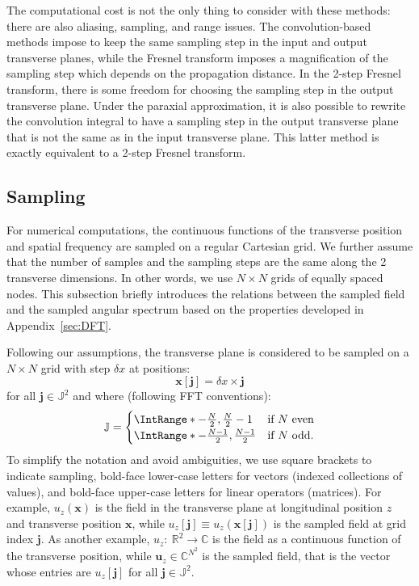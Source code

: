 \documentclass[a4paper]{article}
\newcommand*{\V}[1]{\boldsymbol{#1}}
\newcommand*{\from}{{:}\:}
\newcommand*{\Set}[1]{\mathbb{#1}}
\begin{document}
The computational cost is not the only thing to consider with these methods: there are
also aliasing, sampling, and range issues. The convolution-based methods impose to keep
the same sampling step in the input and output transverse planes, while the Fresnel
transform imposes a magnification of the sampling step which depends on the propagation
distance. In the 2-step Fresnel transform, there is some freedom for choosing the sampling
step in the output transverse plane. Under the paraxial approximation, it is also possible
to rewrite the convolution integral to have a sampling step in the output transverse plane
that is not the same as in the input transverse plane. This latter method is exactly
equivalent to a 2-step Fresnel transform.

\subsection{Sampling}

For numerical computations, the continuous functions of the transverse position and
spatial frequency are sampled on a regular Cartesian grid. We further assume that the
number of samples and the sampling steps are the same along the 2 transverse dimensions.
In other words, we use $N×N$ grids of equally spaced nodes. This subsection briefly
introduces the relations between the sampled field and the sampled angular spectrum based
on the properties developed in Appendix~\ref{sec:DFT}.

Following our assumptions, the transverse plane is considered to be sampled on a $N×N$
grid with step $δx$ at positions:
\begin{equation}
  \label{eq:x[j]}
  \V{x}[\V{j}] = δx×\V{j}
\end{equation}
for all $\V{j} ∈ \Set{J}^{2}$ and where (following FFT conventions):
\begin{equation}
  \label{eq:J}
  \Set{J} =
  \begin{cases}
    \IntRange*{-\tfrac{N}{2},\tfrac{N}{2}-1}
    & \text{if $N$ even}\\
    \IntRange*{-\tfrac{N-1}{2},\tfrac{N-1}{2}}
    & \text{if $N$ odd.}\\
  \end{cases}
\end{equation}
To simplify the notation and avoid ambiguities, we use square brackets to indicate
sampling, bold-face lower-case letters for vectors (indexed collections of values), and
bold-face upper-case letters for linear operators (matrices). For example, $u_{z}(\V{x})$
is the field in the transverse plane at longitudinal position $z$ and transverse position
$\V{x}$, while $u_{z}[\V{j}] ≡ u_{z}(\V{x}[\V{j}])$ is the sampled field at grid index
$\V{j}$. As another example, $u_{z}\from\Set{R}^{2}\to\Set{C}$ is the field as a
continuous function of the transverse position, while $\V{u}_{z} ∈ \Set{C}^{N^{2}}$ is the
sampled field, that is the vector whose entries are $u_{z}[\V{j}]$ for all
$\V{j} ∈ \Set{J}^{2}$.
\end{document}

